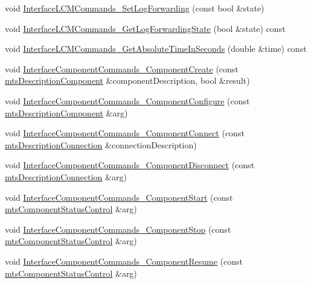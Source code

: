 \begin{DoxyCompactItemize}
\item 
void \hyperlink{classmts_manager_component_client_a4e35db3722fc57873409058c123d7ec3}{Interface\+L\+C\+M\+Commands\+\_\+\+Set\+Log\+Forwarding} (const bool \&state)
\item 
void \hyperlink{classmts_manager_component_client_a943187af07d69373d01e77dcc1c460bf}{Interface\+L\+C\+M\+Commands\+\_\+\+Get\+Log\+Forwarding\+State} (bool \&state) const 
\item 
void \hyperlink{classmts_manager_component_client_aa613964d738cdf8ddd95b2804cd7e1e2}{Interface\+L\+C\+M\+Commands\+\_\+\+Get\+Absolute\+Time\+In\+Seconds} (double \&time) const 
\item 
void \hyperlink{classmts_manager_component_client_a806767b2de84dc3f321cf94bdabdf155}{Interface\+Component\+Commands\+\_\+\+Component\+Create} (const \hyperlink{classmts_description_component}{mts\+Description\+Component} \&component\+Description, bool \&result)
\item 
void \hyperlink{classmts_manager_component_client_a01f07ac088b85aafbbafadd7e1226134}{Interface\+Component\+Commands\+\_\+\+Component\+Configure} (const \hyperlink{classmts_description_component}{mts\+Description\+Component} \&arg)
\item 
void \hyperlink{classmts_manager_component_client_a127c76c11be57fc84ff4eb7f2558248d}{Interface\+Component\+Commands\+\_\+\+Component\+Connect} (const \hyperlink{classmts_description_connection}{mts\+Description\+Connection} \&connection\+Description)
\item 
void \hyperlink{classmts_manager_component_client_adf9f69121fc903ff25375b1c788cf133}{Interface\+Component\+Commands\+\_\+\+Component\+Disconnect} (const \hyperlink{classmts_description_connection}{mts\+Description\+Connection} \&arg)
\item 
void \hyperlink{classmts_manager_component_client_a3dba91132c57038c7fab0aed721a2332}{Interface\+Component\+Commands\+\_\+\+Component\+Start} (const \hyperlink{classmts_component_status_control}{mts\+Component\+Status\+Control} \&arg)
\item 
void \hyperlink{classmts_manager_component_client_aea7d360a980850be7240946beeb308af}{Interface\+Component\+Commands\+\_\+\+Component\+Stop} (const \hyperlink{classmts_component_status_control}{mts\+Component\+Status\+Control} \&arg)
\item 
void \hyperlink{classmts_manager_component_client_ad1aba071e3395654ecb8b15ea3894296}{Interface\+Component\+Commands\+\_\+\+Component\+Resume} (const \hyperlink{classmts_component_status_control}{mts\+Component\+Status\+Control} \&arg)

\end{DoxyCompactItemize}
